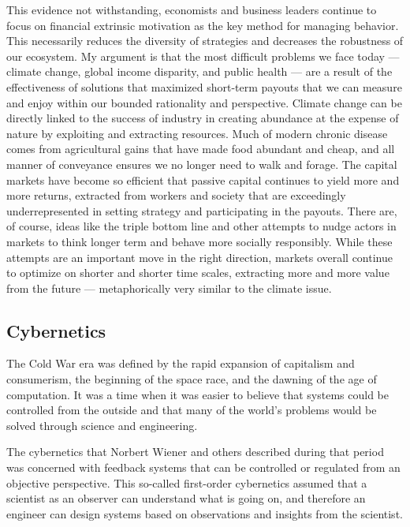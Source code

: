 This evidence not withstanding, economists and business leaders continue to focus on financial extrinsic motivation as the key method for managing behavior. This necessarily reduces the diversity of strategies and decreases the robustness of our ecosystem. My argument is that the most difficult problems we face today --- climate change, global income disparity, and public health --- are a result of the effectiveness of solutions that maximized short-term payouts that we can measure and enjoy within our bounded rationality and perspective. Climate change can be directly linked to the success of industry in creating abundance at the expense of nature by exploiting and extracting resources. Much of modern chronic disease comes from agricultural gains that have made food abundant and cheap, and all manner of conveyance ensures we no longer need to walk and forage. The capital markets have become so efficient that passive capital continues to yield more and more returns, extracted from workers and society that are exceedingly underrepresented in setting strategy and participating in the payouts. There are, of course, ideas like the triple bottom line \cite{hall2011triple} and other attempts to nudge actors in markets to think longer term and behave more socially responsibly. While these attempts are an important move in the right direction, markets overall continue to optimize on shorter and shorter time scales, extracting more and more value from the future --- metaphorically very similar to the climate issue.


\subsection{Cybernetics}
\label{intro:cybernetics}

The Cold War era was defined by the rapid expansion of capitalism and consumerism, the beginning of the space race, and the dawning of the age of computation. It was a time when it was easier to believe that systems could be controlled from the outside and that many of the world's problems would be solved through science and engineering.

The cybernetics that Norbert Wiener and others described \cite{wiener1961cybernetics} during that period was concerned with feedback systems that can be controlled or regulated from an objective perspective. This so-called first-order cybernetics assumed that a scientist as an observer can understand what is going on, and therefore an engineer can design systems based on observations and insights from the scientist.

